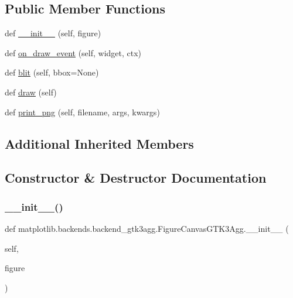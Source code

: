 \subsection*{Public Member Functions}
\begin{DoxyCompactItemize}
\item 
def \hyperlink{classmatplotlib_1_1backends_1_1backend__gtk3agg_1_1FigureCanvasGTK3Agg_a57f22edb7b272c35826d3536dd704a44}{\+\_\+\+\_\+init\+\_\+\+\_\+} (self, figure)
\item 
def \hyperlink{classmatplotlib_1_1backends_1_1backend__gtk3agg_1_1FigureCanvasGTK3Agg_a888365bebaa4d525ef33e65bbb91c79a}{on\+\_\+draw\+\_\+event} (self, widget, ctx)
\item 
def \hyperlink{classmatplotlib_1_1backends_1_1backend__gtk3agg_1_1FigureCanvasGTK3Agg_abeb2e0ef4047c3f825a3b0ce37a973d7}{blit} (self, bbox=None)
\item 
def \hyperlink{classmatplotlib_1_1backends_1_1backend__gtk3agg_1_1FigureCanvasGTK3Agg_a32e47d9a34d98aaa4beb80c28e5fe2d9}{draw} (self)
\item 
def \hyperlink{classmatplotlib_1_1backends_1_1backend__gtk3agg_1_1FigureCanvasGTK3Agg_ab91d3d29aa1f71251cbc7fc8789971cb}{print\+\_\+png} (self, filename, args, kwargs)
\end{DoxyCompactItemize}
\subsection*{Additional Inherited Members}


\subsection{Constructor \& Destructor Documentation}
\mbox{\label{classmatplotlib_1_1backends_1_1backend__gtk3agg_1_1FigureCanvasGTK3Agg_a57f22edb7b272c35826d3536dd704a44}} 
\subsubsection{\texorpdfstring{\+\_\+\+\_\+init\+\_\+\+\_\+()}{\_\_init\_\_()}}
{\footnotesize\ttfamily def matplotlib.\+backends.\+backend\+\_\+gtk3agg.\+Figure\+Canvas\+G\+T\+K3\+Agg.\+\_\+\+\_\+init\+\_\+\+\_\+ (\begin{DoxyParamCaption}\item[{}]{self,  }\item[{}]{figure }\end{DoxyParamCaption})}



